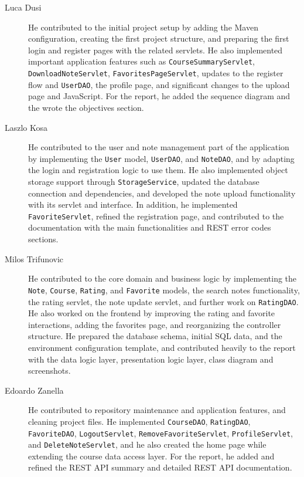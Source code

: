 \begin{description}
	\item[Luca Dusi] He contributed to the initial project setup by adding the Maven configuration, creating the first project structure, and preparing the first login and register pages with the related servlets. He also implemented important application features such as \texttt{CourseSummaryServlet}, \texttt{DownloadNoteServlet}, \texttt{FavoritesPageServlet}, updates to the register flow and \texttt{UserDAO}, the profile page, and significant changes to the upload page and JavaScript. For the report, he added the sequence diagram and the wrote  the objectives section.
	\item[Laszlo Kosa] He contributed to the user and note management part of the application by implementing the \texttt{User} model, \texttt{UserDAO}, and \texttt{NoteDAO}, and by adapting the login and registration logic to use them. He also implemented object storage support through \texttt{StorageService}, updated the database connection and dependencies, and developed the note upload functionality with its servlet and interface. In addition, he implemented \texttt{FavoriteServlet}, refined the registration page, and contributed to the documentation with the main functionalities and REST error codes sections.
	\item[Milos Trifunovic] He contributed to the core domain and business logic by implementing the \texttt{Note}, \texttt{Course}, \texttt{Rating}, and \texttt{Favorite} models, the search notes functionality, the rating servlet, the note update servlet, and further work on \texttt{RatingDAO}. He also worked on the frontend by improving the rating and favorite interactions, adding the favorites page, and reorganizing the controller structure. He prepared the database schema, initial SQL data, and the environment configuration template, and contributed heavily to the report with the data logic layer, presentation logic layer, class diagram and screenshots.
	\item[Edoardo Zanella] He contributed to repository maintenance and application features, and cleaning project files. He implemented \texttt{CourseDAO}, \texttt{RatingDAO}, \texttt{FavoriteDAO}, \texttt{LogoutServlet}, \texttt{RemoveFavoriteServlet}, \texttt{ProfileServlet}, and \texttt{DeleteNoteServlet}, and he also created the home page while extending the course data access layer. For the report, he added and refined the REST API summary and detailed REST API documentation.

\end{description}
